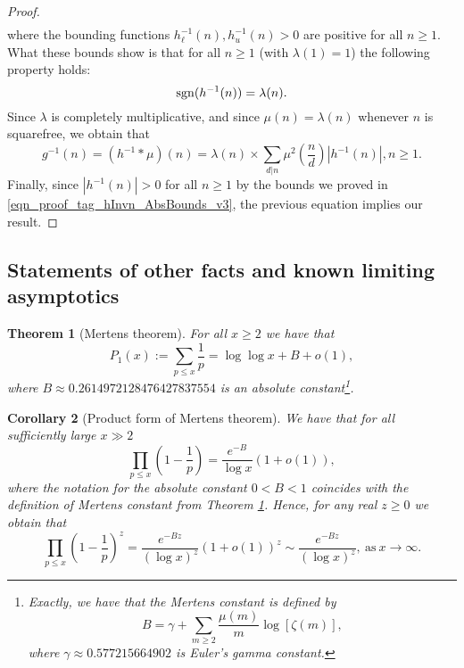 \documentclass[11pt,reqno,a4letter]{article}
\numberwithin{figure}{section}
\numberwithin{table}{section}
\theoremstyle{plain}
\newtheorem{theorem}{Theorem}
\newtheorem{cor}[theorem]{Corollary}
\numberwithin{theorem}{section}
\theoremstyle{definition}
\begin{document}
\begin{proof}
\begin{align}
\end{align} 
where the bounding functions $h_{\ell}^{-1}(n), h_{u}^{-1}(n) > 0$ are positive for all $n \geq 1$. 
What these bounds show is that for all $n \geq 1$ (with $\lambda(1) = 1$) the following property holds: 
\begin{equation} 
\notag 
\operatorname{sgn}(h^{-1}(n)) = \lambda(n). 
\end{equation} 
Since $\lambda$ is completely multiplicative, and since $\mu(n) = \lambda(n)$ whenever $n$ is squarefree, 
we obtain that 
\[
g^{-1}(n) = (h^{-1} \ast \mu)(n) = \lambda(n) \times \sum_{d|n} \mu^2\left(\frac{n}{d}\right) |h^{-1}(n)|, n \geq 1. 
\]
Finally, since $|h^{-1}(n)| > 0$ for all $n \geq 1$ by the bounds we proved in 
\eqref{eqn_proof_tag_hInvn_AbsBounds_v3}, the previous equation implies our result. 
\end{proof} 

\subsection{Statements of other facts and known limiting asymptotics} 
\label{subSection_OtherFactsAndResults} 

\begin{theorem}[Mertens theorem]
\label{theorem_Mertens_theorem} 
For all $x \geq 2$ we have that 
\[
P_1(x) := \sum_{p \leq x} \frac{1}{p} = \log\log x + B + o(1), 
\]
where 
$B \approx 0.2614972128476427837554$ 
is an absolute constant\footnote{ 
     Exactly, we have that the \emph{Mertens constant} is defined by 
     \[
     B = \gamma + \sum_{m \geq 2} \frac{\mu(m)}{m} \log\left[\zeta(m)\right], 
     \]
     where $\gamma \approx 0.577215664902$ is Euler's gamma constant. 
}.
\end{theorem} 

\begin{cor}[Product form of Mertens theorem] 
\label{lemma_Gz_productTermV2} 
We have that for all sufficiently large $x \gg 2$ 
\[
\prod_{p \leq x} \left(1 - \frac{1}{p}\right) = \frac{e^{-B}}{\log x}\left( 
     1 + o(1)\right), 
\]
where the notation for the absolute constant $0 < B < 1$ coincides with the definition of 
Mertens constant from Theorem \ref{theorem_Mertens_theorem}. 
Hence, for any real $z \geq 0$ we obtain that 
\[
\prod_{p \leq x} \left(1 - \frac{1}{p}\right)^{z} = 
     \frac{e^{-Bz}}{(\log x)^{z}} \left(1+o(1)\right)^{z} \sim 
     \frac{e^{-Bz}}{(\log x)^{z}}, \mathrm{\ as\ } x \rightarrow \infty. 
\]
\end{cor} 
\end{document}

